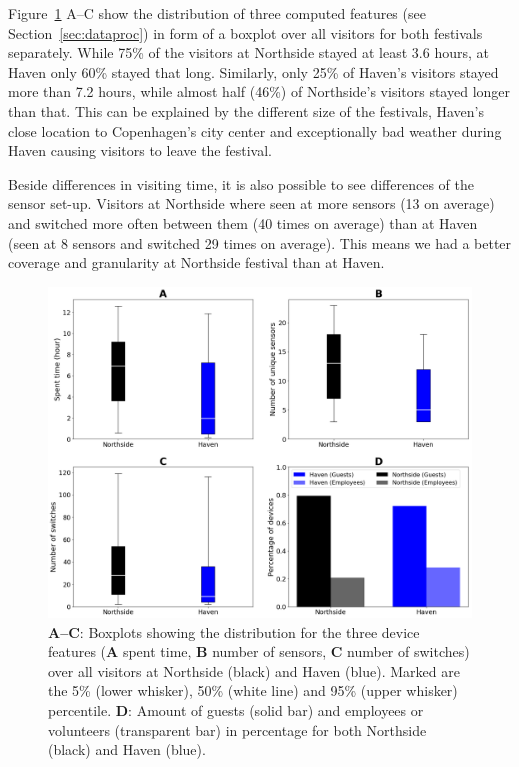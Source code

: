 Figure~\ref{fig:features} A--C show the distribution of three computed features (see Section~\ref{sec:dataproc}) in form of a boxplot over all visitors for both festivals separately. While 75\% of the visitors at Northside stayed at least 3.6 hours, at Haven only 60\% stayed that long. Similarly, only 25\% of Haven's visitors stayed more than 7.2 hours, while almost half (46\%) of Northside's visitors stayed longer than that. This can be explained by the different size of the festivals, Haven's close location to Copenhagen's city center and exceptionally bad weather during Haven causing visitors to leave the festival.

Beside differences in visiting time, it is also possible to see differences of the sensor set-up. Visitors at Northside where seen at more sensors (13 on average) and switched more often between them (40 times on average) than at Haven (seen at 8 sensors and switched 29 times on average). This means we had a better coverage and granularity at Northside festival than at Haven.

\begin{figure}[tb]
  \centering
  \includegraphics[width=\linewidth]{figs/features_boxplot.png}
  \caption{\textbf{A--C}: Boxplots showing the distribution for the three device features (\textbf{A} spent time, \textbf{B} number of sensors, \textbf{C} number of switches) over all visitors at Northside (black) and Haven (blue). Marked are the 5\% (lower whisker), 50\% (white line) and 95\% (upper whisker) percentile. \textbf{D}: Amount of guests (solid bar) and employees or volunteers (transparent bar) in percentage for both Northside (black) and Haven (blue).}
  \label{fig:features}
\end{figure}